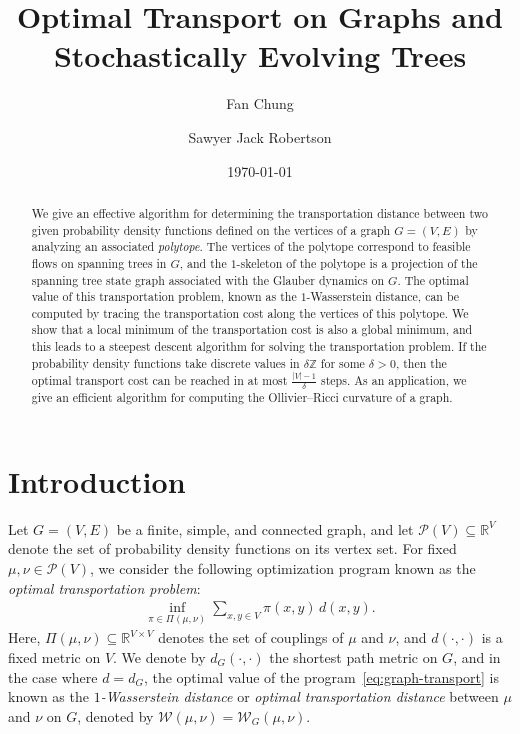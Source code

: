 \documentclass[11pt,a4paper]{article}
\title{Optimal Transport on Graphs and Stochastically Evolving Trees}
\author{Fan Chung \and Sawyer Jack Robertson}
\date{\today}
\newcommand{\prob}{{\mathscr{P}}}
\newcommand{\wass}{{\mathcal{W}}}
\begin{document}
	
	\maketitle

    \begin{abstract}
        We give an effective algorithm for determining the transportation distance between two given probability density functions defined on the vertices of a graph $G=(V,E)$ by analyzing an associated \emph{polytope}. The vertices of the polytope correspond to feasible flows on spanning trees in $G$, and the $1$-skeleton of the polytope is a projection of the spanning tree state graph associated with the Glauber dynamics on $G$. The optimal value of this transportation problem, known as the $1$-Wasserstein distance, can be computed by tracing the transportation cost along the vertices of this polytope. We show that a local minimum of the transportation cost is also a global minimum, and this leads to a steepest descent algorithm for solving the transportation problem. If the probability density functions take discrete values in $\delta \mathbb{Z}$ for some $\delta>0$, then the optimal transport cost can be reached in at most $\frac{|V|-1}{\delta}$ steps. As an application, we give an efficient algorithm for computing the Ollivier--Ricci curvature of a graph.
    \end{abstract}

    \section{Introduction}
        
    Let $G=(V,E)$ be a finite, simple, and connected graph, and let $\prob(V)\subseteq\mathbb{R}^{V}$ denote the set of probability density functions on its vertex set. For fixed $\mu,\nu\in\prob(V)$, we consider the following optimization program known as the \emph{optimal transportation problem}:
        \begin{align}\label{eq:graph-transport}
            \inf_{\pi\in\Pi(\mu,\nu)} \sum_{x, y\in V} \pi(x,y)\, d(x,y).
        \end{align}
    Here, $\Pi(\mu,\nu)\subseteq\mathbb{R}^{V\times V}$ denotes the set of couplings of $\mu$ and $\nu$, and $d(\cdot,\cdot)$ is a fixed metric on $V$. We denote by $d_G(\cdot,\cdot)$ the shortest path metric on $G$, and in the case where $d=d_G$, the optimal value of the program~\cref{eq:graph-transport} is known as the \emph{$1$-Wasserstein distance} or \emph{optimal transportation distance} between $\mu$ and $\nu$ on $G$, denoted by $\wass(\mu,\nu)=\wass_G(\mu,\nu)$.
    
\end{document}
